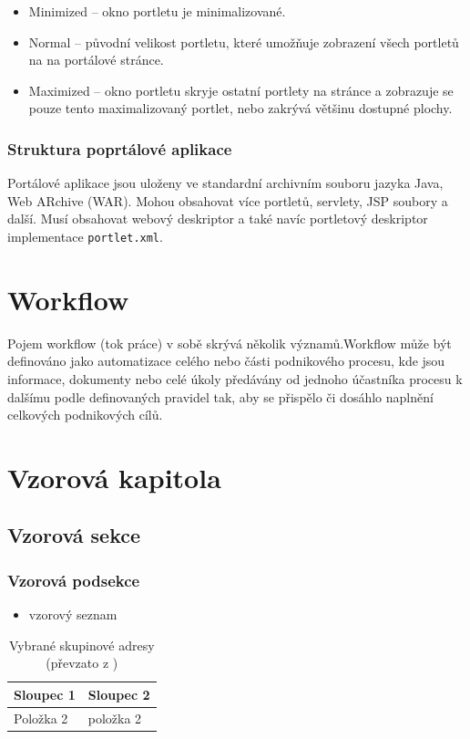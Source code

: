 \documentclass{fithesis}
\begin{document}
\begin{itemize}
\item Minimized -- okno portletu je minimalizované.
\item Normal -- původní velikost portletu, které umožňuje zobrazení všech portletů na na portálové stránce.
\item Maximized -- okno portletu skryje ostatní portlety na stránce a zobrazuje se pouze tento maximalizovaný portlet, nebo zakrývá většinu dostupné plochy.
\end{itemize}

\subsection{Struktura poprtálové aplikace}
Portálové aplikace jsou uloženy ve standardní archivním souboru jazyka Java, Web ARchive (WAR). Mohou obsahovat více portletů, servlety, JSP soubory a další. Musí obsahovat webový deskriptor a také navíc portletový deskriptor implementace \verb|portlet.xml|.

\chapter{Workflow}
Pojem workflow (tok práce) v sobě skrývá několik významů.Workflow může být definováno jako automatizace celého nebo části podnikového procesu, kde jsou informace, dokumenty nebo celé úkoly předávány od jednoho účastníka procesu k dalšímu podle definovaných pravidel tak, aby se přispělo či dosáhlo naplnění celkových podnikových cílů. \cite{workflow}



\chapter{Vzorová kapitola}
\section{Vzorová sekce}
\subsection{Vzorová podsekce}



\begin{itemize}
\item vzorový seznam
\end{itemize}


\begin{table}
\centering
\begin{tabular}{|p{3cm}|p{8cm}|}
\hline Sloupec 1 & Sloupec 2 \\
\hline Položka 2 & položka 2 \\
\hline
\end{tabular}
\caption{Vybrané skupinové adresy (převzato z \cite{satrapa-ipv6})}
\end{table}
\end{document}
